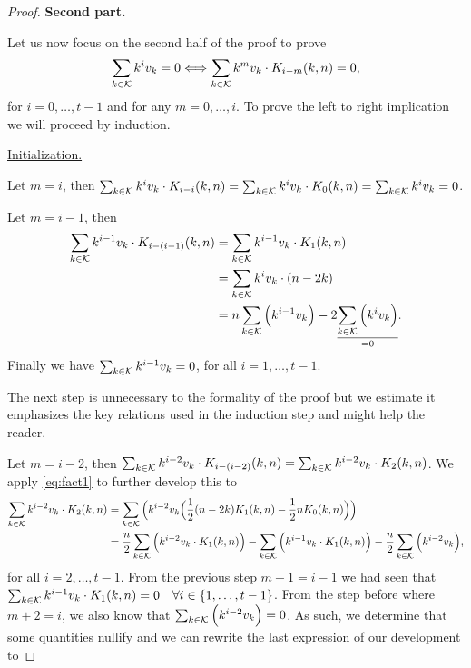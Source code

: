 \begin{proof}
    \textbf{Second part.}

    Let us now focus on the second half of the proof to prove
    $$\sum_{k \in \mathcal{K}} k^iv_k = 0 \Longleftrightarrow \sum_{k \in \mathcal{K}} k^mv_k \cdot K_{i-m}(k, n) = 0,$$ for $i = 0, \ldots, t-1$ and for any $m = 0, \ldots, i$. To prove the left to right implication we will proceed by induction.

    \underline{Initialization.}

    Let $m = i$, then $\sum_{k \in \mathcal{K}} k^iv_k \cdot K_{i - i}(k, n) = \sum_{k \in \mathcal{K}} k^iv_k \cdot K_{0}(k, n) = \sum_{k \in \mathcal{K}} k^iv_k = 0$.

    Let $m = i - 1$, then
    \begin{equation*}
        \begin{split}
            \sum_{k \in \mathcal{K}} k^{i-1}v_k \cdot K_{i - (i-1)}(k, n) &= \sum_{k \in \mathcal{K}} k^{i-1}v_k \cdot K_{1}(k, n)\\ &= \sum_{k \in \mathcal{K}} k^iv_k \cdot (n - 2k)\\ &= n\sum_{k \in \mathcal{K}} \Big( k^{i-1}v_k \Big) - 2\underset{=0}{\underline{\sum_{k \in \mathcal{K}} \Big( k^iv_k \Big)}}.
        \end{split}
    \end{equation*}
    Finally we have $\sum_{k \in \mathcal{K}} k^{i-1}v_k = 0$, for all $i = 1, \ldots, t-1$.

    The next step is unnecessary to the formality of the proof but we estimate it emphasizes the key relations used in the induction step and might help the reader.

    Let $m = i - 2$, then $\sum_{k \in \mathcal{K}} k^{i-2}v_k \cdot K_{i - (i-2)}(k, n) = \sum_{k \in \mathcal{K}} k^{i-2}v_k \cdot K_{2}(k, n)$. We apply \cref{eq:fact1} to further develop this to
    \begin{equation*}
        \begin{split}
            \sum_{k \in \mathcal{K}} k^{i-2}v_k \cdot K_{2}(k, n) &= \sum_{k \in \mathcal{K}} \Big( k^{i-2}v_k \Big( \frac{1}{2}(n - 2k)K_1(k, n) - \frac{1}{2}nK_0(k, n) \Big)\Big)\\
            &= \frac{n}{2}\sum_{k \in \mathcal{K}} \Big( k^{i-2}v_k \cdot K_1(k, n) \Big) - \sum_{k \in \mathcal{K}} \Big( k^{i-1}v_k \cdot K_1(k,n) \Big) - \frac{n}{2}\sum_{k \in \mathcal{K}} \Big( k^{i-2}v_k \Big),
        \end{split}
    \end{equation*}
    for all $i = 2, \ldots, t-1$.
    From the previous step $m + 1 = i - 1$ we had seen that $\sum_{k \in \mathcal{K}} k^{i-1}v_k \cdot K_1(k, n) = 0\quad \forall i\in \{1, \ldots, t-1\}$. From the step before where $m + 2 = i$, we also know that $\sum_{k \in \mathcal{K}} \Big( k^{i-2}v_k \Big) = 0$. As such, we determine that some quantities nullify and we can rewrite the last expression of our development to


\end{proof}
